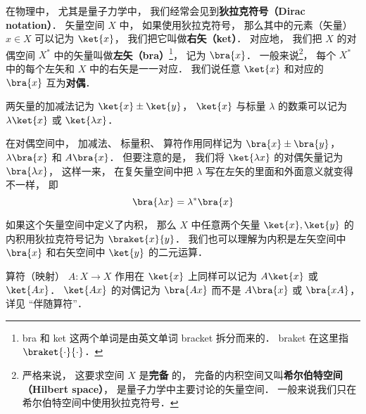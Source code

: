 

在物理中， 尤其是量子力学中， 我们经常会见到\textbf{狄拉克符号（Dirac notation）}． 矢量空间 $X$ 中， 如果使用狄拉克符号， 那么其中的元素（矢量） $x\in X$ 可以记为 $\ket{x}$， 我们把它叫做\textbf{右矢（ket）}． 对应地， 我们把 $X$ 的对偶空间 $X^*$ 中的矢量叫做\textbf{左矢（bra）}\footnote{bra 和 ket 这两个单词是由英文单词 bracket 拆分而来的． braket 在这里指 $\braket{\cdot}{\cdot}$．}， 记为 $\bra{x}$． 一般来说\footnote{严格来说， 这要求空间 $X$ 是\textbf{完备}%
的， 完备的内积空间又叫\textbf{希尔伯特空间（Hilbert space）}， 是量子力学中主要讨论的矢量空间． 一般来说我们只在希尔伯特空间中使用狄拉克符号．}， 每个 $X^*$ 中的每个左矢和 $X$ 中的右矢是一一对应． 我们说任意 $\ket{x}$ 和对应的 $\bra{x}$ 互为\textbf{对偶}．

两矢量的加减法记为 $\ket{x} \pm \ket{y}$， $\ket{x}$ 与标量 $\lambda$ 的数乘可以记为 $\lambda\ket{x}$ 或 $\ket{\lambda x}$．

在对偶空间中， 加减法、 标量积、 算符作用同样记为 $\bra{x} \pm \bra{y}$， $\lambda\bra{x}$ 和 $A\bra{x}$． 但要注意的是， 我们将 $\ket{\lambda x}$ 的对偶矢量记为 $\bra{\lambda x}$， 这样一来， 在复矢量空间中把 $\lambda$ 写在左矢的里面和外面意义就变得不一样， 即 %
\begin{equation}
\bra{\lambda x} = \lambda^* \bra{x}
\end{equation}

如果这个矢量空间中定义了内积， 那么 $X$ 中任意两个矢量 $\ket{x}, \ket{y}$ 的内积用狄拉克符号记为 $\braket{x}{y}$． 我们也可以理解为内积是左矢空间中 $\bra{x}$ 和右矢空间中 $\ket{y}$ 的二元运算．

算符（映射） $A:X\to X$ 作用在 $\ket{x}$ 上同样可以记为 $A\ket{x}$ 或 $\ket{Ax}$． $\ket{Ax}$ 的对偶记为 $\bra{Ax}$ 而不是 $A\bra{x}$ 或 $\bra{xA}$， 详见 “伴随算符”．

